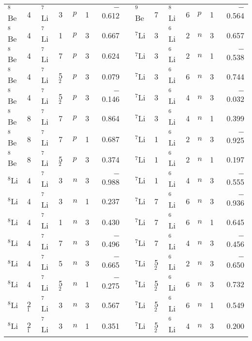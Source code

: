 \documentclass[
12pt, %
oneside, %
english, %
doublespacing, %
doublespacing, %
toctotoc, %
parskip, %
headsepline, %
]{MastersDoctoralThesis} %
\begin{document}
\begin{table*}[tp]
\begin{tabular*}{\textwidth}{@{\extracolsep{\fill}}llllllrl@{\extracolsep{\fill}}llllllr@{\extracolsep{\fill}}}
$^8$Be  & 4  & ${}^7$Li   & 3   & $p$       & 1   & $-$0.612 &  & ${}^9$Be  & 7  & ${}^8$Li    & 6   & $p$       & 1   & $-$0.564  \\
$^8$Be  & 4  & ${}^7$Li   & 1   & $p$       & 3   & 0.667  &  & ${}^7$Li  & 3  & ${}^6$Li   & 2   & $n$       & 3   & 0.657   \\
$^8$Be  & 4  & ${}^7$Li   & 7   & $p$       & 3   & 0.624  &  & ${}^7$Li  & 3  & ${}^6$Li   & 2   & $n$       & 1   & $-$0.538  \\
$^8$Be  & 4  & ${}^7$Li   & 5$_2$   & $p$       & 3   & 0.079  &  & ${}^7$Li  & 3  & ${}^6$Li   & 6   & $n$       & 3   & 0.744   \\
$^8$Be  & 4  & ${}^7$Li   & 5$_2$   & $p$       & 3   & $-$0.146 &  & ${}^7$Li  & 3  & ${}^6$Li   & 4   & $n$       & 3   & $-$0.032  \\
$^8$Be  & 8  & ${}^7$Li   & 7   & $p$       & 3   & 0.864  &  & ${}^7$Li  & 3  & ${}^6$Li   & 4   & $n$       & 1   & 0.399   \\
$^8$Be  & 8  & ${}^7$Li   & 7   & $p$       & 1   & 0.687  &  & ${}^7$Li  & 1  & ${}^6$Li   & 2   & $n$       & 3   & $-$0.925  \\
$^8$Be  & 8  & ${}^7$Li   & 5$_2$   & $p$       & 3   & 0.374  &  & ${}^7$Li  & 1  & ${}^6$Li   & 2   & $n$       & 1   & 0.197   \\
$^8$Li  & 4  & ${}^7$Li   & 3   & $n$       & 3   & $-$0.988 &  & ${}^7$Li  & 1  & ${}^6$Li   & 4   & $n$       & 3   & $-$0.555  \\
$^8$Li  & 4  & ${}^7$Li   & 3   & $n$       & 1   & 0.237  &  & ${}^7$Li  & 7  & ${}^6$Li   & 6   & $n$       & 3   & $-$0.936  \\
$^8$Li  & 4  & ${}^7$Li   & 1   & $n$       & 3   & 0.430   &  & ${}^7$Li  & 7  & ${}^6$Li   & 6   & $n$       & 1   & 0.645   \\
$^8$Li  & 4  & ${}^7$Li   & 7   & $n$       & 3   & $-$0.496 &  & ${}^7$Li  & 7  & ${}^6$Li   & 4   & $n$       & 3   & $-$0.456  \\
$^8$Li  & 4  & ${}^7$Li   & 5   & $n$       & 3   & $-$0.665 &  & ${}^7$Li  & 5$_2$  & ${}^6$Li   & 2   & $n$       & 3   & $-$0.650   \\
$^8$Li  & 4  & ${}^7$Li   & 5$_2$   & $n$       & 1   & $-$0.275 &  & ${}^7$Li  & 5$_2$  & ${}^6$Li   & 6   & $n$       & 3   & 0.732   \\
$^8$Li  & 2$_1$  & ${}^7$Li   & 3   & $n$       & 3   & 0.567  &  & ${}^7$Li  & 5$_2$  & ${}^6$Li   & 6   & $n$       & 1   & 0.549   \\
$^8$Li  & 2$_1$  & ${}^7$Li   & 3   & $n$       & 1   & 0.351  &  & ${}^7$Li  & 5$_2$  & ${}^6$Li   & 4   & $n$       & 3   & 0.200     \\

\end{tabular*}
\end{table*}
\end{document}
